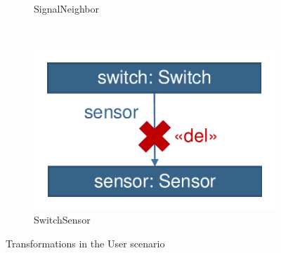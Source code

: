 \begin{figure}
\begin{subfigure}[b]{0.3\textwidth}
                \caption{\textsf{SignalNeighbor}}
                \label{fig:trainbenchmark-transformation-user-signalneighbor}
        \end{subfigure}%
        ~
        \begin{subfigure}[b]{0.3\textwidth}
                \centering
                \includegraphics[scale=0.35]{figures/trainbenchmark-transformation-user-switchsensor}
                \caption{\textsf{SwitchSensor}}
                \label{fig:trainbenchmark-transformation-user-switchsensor}
        \end{subfigure}
        \caption{Transformations in the User scenario}\label{fig:trainbenchmark-transformations-xform}
\end{figure}


